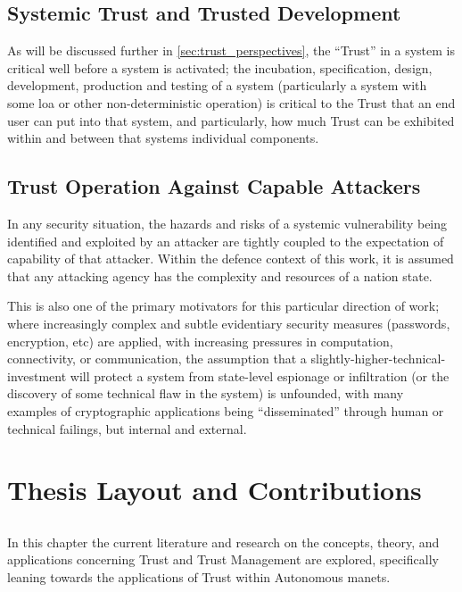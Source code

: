 \subsection{Systemic Trust and Trusted Development}
As will be discussed further in \autoref{sec:trust_perspectives}, the ``Trust'' in a system is critical well before a system is activated; the incubation, specification, design, development, production and testing of a system (particularly a system with some \gls{loa} or other non-deterministic operation) is critical to the Trust that an end user can put into that system, and particularly, how much Trust can be exhibited within and between that systems individual components.

\subsection{Trust Operation Against Capable Attackers}\label{sec:capable_attackers}

In any security situation, the hazards and risks of a systemic vulnerability being identified and exploited by an attacker are tightly coupled to the expectation of capability of that attacker.
Within the defence context of this work, it is assumed that any attacking agency has the complexity and resources of a nation state.

This is also one of the primary motivators for this particular direction of work; where increasingly complex and subtle evidentiary security measures (passwords, encryption, etc) are applied, with increasing pressures in computation, connectivity, or communication, the assumption that a slightly-higher-technical-investment will protect a system from state-level espionage or infiltration (or the discovery of some technical flaw in the system) is unfounded, with many examples of cryptographic applications being ``disseminated'' through human or technical failings, but internal and external. 


\section{Thesis Layout and Contributions}

\subsection{}
In this chapter the current literature and research on the concepts, theory, and applications concerning Trust and Trust Management are explored, specifically leaning towards the applications of Trust within Autonomous \glspl{manet}.

